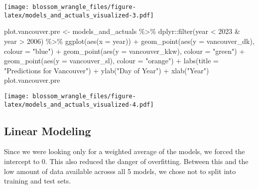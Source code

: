 \documentclass[
]{article}
\newenvironment{Shaded}{\begin{snugshade}}{\end{snugshade}}
\newcommand{\AttributeTok}[1]{\textcolor[rgb]{0.77,0.63,0.00}{#1}}
\newcommand{\DecValTok}[1]{\textcolor[rgb]{0.00,0.00,0.81}{#1}}
\newcommand{\FunctionTok}[1]{\textcolor[rgb]{0.00,0.00,0.00}{#1}}
\newcommand{\NormalTok}[1]{#1}
\newcommand{\OtherTok}[1]{\textcolor[rgb]{0.56,0.35,0.01}{#1}}
\newcommand{\SpecialCharTok}[1]{\textcolor[rgb]{0.00,0.00,0.00}{#1}}
\newcommand{\StringTok}[1]{\textcolor[rgb]{0.31,0.60,0.02}{#1}}
\begin{document}
\texttt{[image: blossom\_wrangle\_files/figure-latex/models\_and\_actuals\_visualized-3.pdf]}

\begin{Shaded}
\begin{Highlighting}[]
\NormalTok{plot.vancouver.pre }\OtherTok{\textless{}{-}}\NormalTok{ models\_and\_actuals }\SpecialCharTok{\%\textgreater{}\%}\NormalTok{ dplyr}\SpecialCharTok{::}\FunctionTok{filter}\NormalTok{(year }\SpecialCharTok{\textless{}} \DecValTok{2023} \SpecialCharTok{\&}\NormalTok{ year }\SpecialCharTok{\textgreater{}} \DecValTok{2006}\NormalTok{) }\SpecialCharTok{\%\textgreater{}\%} 
  \FunctionTok{ggplot}\NormalTok{(}\FunctionTok{aes}\NormalTok{(}\AttributeTok{x =}\NormalTok{ year)) }\SpecialCharTok{+}
  \FunctionTok{geom\_point}\NormalTok{(}\FunctionTok{aes}\NormalTok{(}\AttributeTok{y =}\NormalTok{ vancouver\_dk), }\AttributeTok{colour =} \StringTok{"blue"}\NormalTok{) }\SpecialCharTok{+}
  \FunctionTok{geom\_point}\NormalTok{(}\FunctionTok{aes}\NormalTok{(}\AttributeTok{y =}\NormalTok{ vancouver\_kkw), }\AttributeTok{colour =} \StringTok{"green"}\NormalTok{) }\SpecialCharTok{+}
  \FunctionTok{geom\_point}\NormalTok{(}\FunctionTok{aes}\NormalTok{(}\AttributeTok{y =}\NormalTok{ vancouver\_sl), }\AttributeTok{colour =} \StringTok{"orange"}\NormalTok{) }\SpecialCharTok{+}
  \FunctionTok{labs}\NormalTok{(}\AttributeTok{title =} \StringTok{"Predictions for Vancouver"}\NormalTok{) }\SpecialCharTok{+}
  \FunctionTok{ylab}\NormalTok{(}\StringTok{"Day of Year"}\NormalTok{) }\SpecialCharTok{+}
  \FunctionTok{xlab}\NormalTok{(}\StringTok{"Year"}\NormalTok{)}
\NormalTok{plot.vancouver.pre}
\end{Highlighting}
\end{Shaded}

\texttt{[image: blossom\_wrangle\_files/figure-latex/models\_and\_actuals\_visualized-4.pdf]}

\hypertarget{linear-modeling}{%
\subsection{Linear Modeling}\label{linear-modeling}}

Since we were looking only for a weighted average of the models, we
forced the intercept to 0. This also reduced the danger of overfitting.
Between this and the low amount of data available acrosss all 5 models,
we chose not to split into training and test sets.
\end{document}
